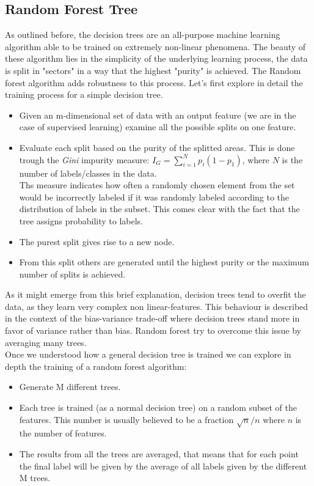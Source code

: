 \documentclass[12pt]{article} %
\numberwithin{equation}{subsection}
\begin{document}
\subsection*{Random Forest Tree}

As outlined before, the decision trees are an all-purpose machine learning algorithm able to be trained on extremely non-linear phenomena. The beauty of these algorithm lies in the simplicity of the underlying learning process, the data is split in "sectors" in a way that the highest "purity" is achieved. The Random forest algorithm adds robustness to this process. Let's first explore in detail the training process for a simple decision tree.\\

\begin{itemize}
	\item  Given an m-dimensional set of data with an output feature (we are in the case of supervised learning) examine all the possible splits on one feature.
	\item Evaluate each split based on the purity of the splitted areas. This is done trough the \textit{Gini} impurity measure: $I_G = \sum\limits_{i=1}^N p_i(1-p_1)$, where $N$ is the number of labels/classes in the data.\\
	Ths measure indicates how often a randomly chosen element from the set would be incorrectly labeled if it was randomly labeled according to the distribution of labels in the subset. This comes clear with the fact that the tree assigns probability to labels.
	\item The purest split gives rise to a new node.
	\item From this split others are generated until the highest purity or the maximum number of splits is achieved.\\
\end{itemize}

As it might emerge from this brief explanation, decision trees tend to overfit the data, as they learn very complex non linear-features. This behaviour is described in the context of the bias-variance trade-off where decision trees stand more in favor of variance rather than bias. Random forest try to overcome this issue by averaging many trees.\\
Once we understood how a general decision tree is trained we can explore in depth the training of a random forest algorithm:

\begin{itemize}
	\item Generate M different trees.
	\item Each tree is trained (as a normal decision tree) on a random subset of the features. This number is usually believed to be a fraction $\sqrt{n}/n$ where $n$ is the number of features.
	\item The results from all the trees are averaged, that means that for each point the final label will be given by the average of all labels given by the different M trees. 
\end{itemize}
\end{document}
